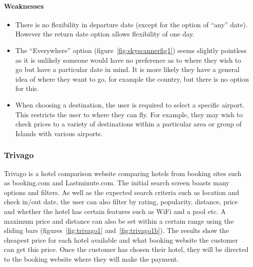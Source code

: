 \paragraph{Weaknesses}
\begin{itemize}
	\item There is no flexibility in departure date (except for the option of
		``any'' date). However the return date option allows flexibility of one
		day.
	\item The ``Everywhere'' option (figure~\ref{fig:skyscannerfig1}) seems
		slightly pointless as it is unlikely someone would have no preference
		as to where they wish to go but have a particular date in mind. It is
		more likely they have a general idea of where they want to go, for
		example the country, but there is no option for this.
	\item When choosing a destination, the user is required to select a
		specific airport. This restricts the user to where they can fly. For
		example, they may wish to check prices to a variety of destinations
		within a particular area or group of Islands with various airports.
\end{itemize}

\subsubsection{Trivago}
\label{ssub:trivago}

Trivago is a hotel comparison website comparing hotels from booking sites such
as booking.com and Lastminute.com. The initial search screen boasts many
options and filters. As well as the expected search criteria such as location
and check in/out date, the user can also filter by rating, popularity,
distance, price and whether the hotel has certain features such as WiFi and a
pool etc. A maximum price and distance can also be set within a certain range
using the sliding bars (figures~\ref{fig:trivago1} and~\ref{fig:trivago1b}).
The results show the cheapest price for each hotel available and what booking
website the customer can get this price. Once the customer has chosen their
hotel, they will be directed to the booking website where they will make the
payment.

